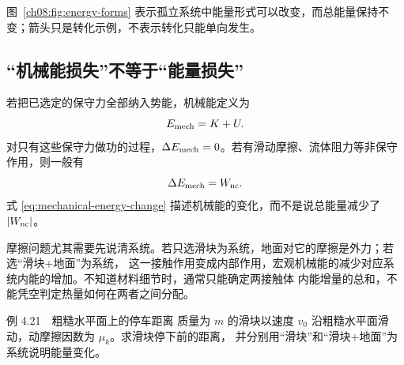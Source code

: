 图~\ref{ch08:fig:energy-forms} 表示孤立系统中能量形式可以改变，而总能量保持不变；箭头只是转化示例，不表示转化只能单向发生。
\begin{center}\begin{minipage}{.98\linewidth}\centering
{}
\par{}
\label{ch08:fig:energy-forms}
\end{minipage}\end{center}

\subsection{“机械能损失”不等于“能量损失”}

若把已选定的保守力全部纳入势能，机械能定义为
\[
  E_{\rm mech}=K+U.
\]
对只有这些保守力做功的过程，$\Delta E_{\rm mech}=0$。若有滑动摩擦、流体阻力等非保守作用，则一般有
\begin{equation}
  \Delta E_{\rm mech}=W_{\rm nc}.
  \label{eq:mechanical-energy-change}
\end{equation}
式 \eqref{eq:mechanical-energy-change} 描述机械能的变化，而不是说总能量减少了 $|W_{\rm nc}|$。

摩擦问题尤其需要先说清系统。若只选滑块为系统，地面对它的摩擦是外力；若选“滑块+地面”为系统，
这一接触作用变成内部作用，宏观机械能的减少对应系统内能的增加。不知道材料细节时，通常只能确定两接触体
内能增量的总和，不能凭空判定热量如何在两者之间分配。

\begin{origexamplebox}{例 4.21　粗糙水平面上的停车距离}
质量为 $m$ 的滑块以速度 $v_0$ 沿粗糙水平面滑动，动摩擦因数为 $\mu_k$。求滑块停下前的距离，
并分别用“滑块”和“滑块+地面”为系统说明能量变化。
\end{origexamplebox}

